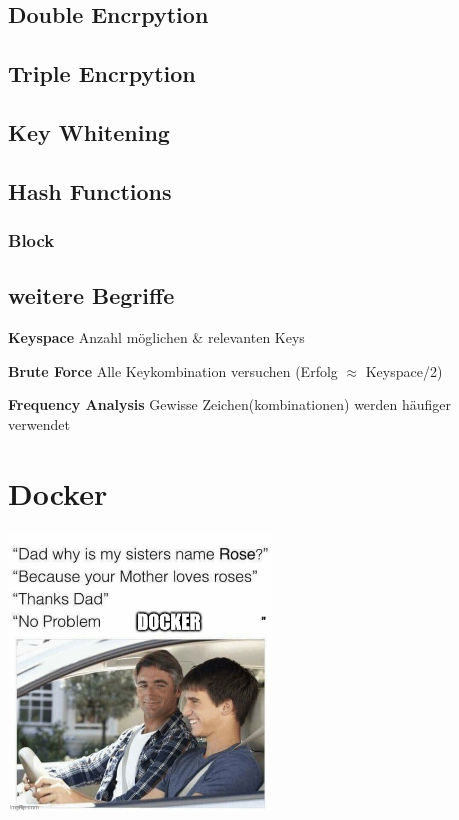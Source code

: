 \documentclass[
  10pt,
  a4paper,
  twocolumn]{article}
\begin{document}
\subsection{Double Encrpytion}\label{double-encrpytion}

\subsection{Triple Encrpytion}\label{triple-encrpytion}

\subsection{Key Whitening}\label{key-whitening}

\subsection{Hash Functions}\label{hash-functions}

\subsubsection{Block}\label{block}

\subsection{weitere Begriffe}\label{weitere-begriffe}

{\small
\textbf{Keyspace} Anzahl möglichen \& relevanten Keys

\textbf{Brute Force} Alle Keykombination versuchen (Erfolg $\approx$ Keyspace/2)

\textbf{Frequency Analysis} Gewisse Zeichen(kombinationen) werden häufiger verwendet 

}

\section{\texorpdfstring{Docker }{Docker }}\label{docker}

\begin{center}
\includegraphics[width=7cm,height=\textheight]{images/meme_docker.jpg}
\end{center}
\end{document}
